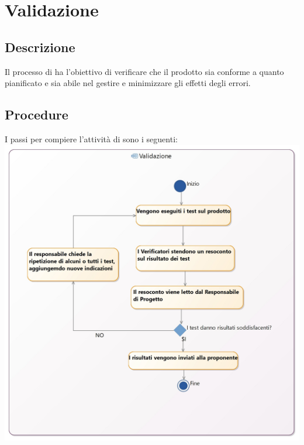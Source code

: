 \documentclass[NormeDiProgetto.tex]{subfiles}
\begin{document}
	\section{Validazione}
	\subsection{Descrizione}
		Il processo di  ha l'obiettivo di verificare che il prodotto sia conforme a quanto pianificato e sia abile nel gestire e minimizzare gli effetti degli errori.
	\subsection{Procedure}
		I passi per compiere l’attività di  sono i seguenti:\\
		\includegraphics[scale=0.2]{../../common/images/Validation}

	 
	
	
\end{document}
